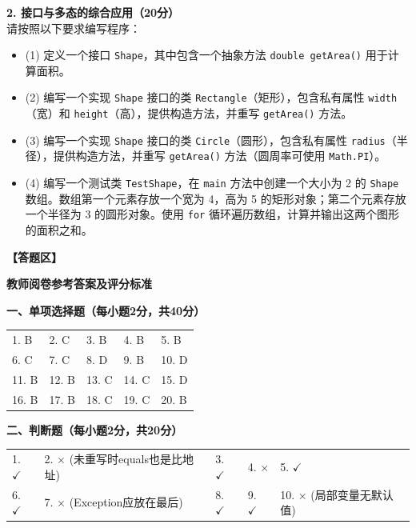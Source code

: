 \documentclass[a3paper, landscape, 11pt, twocolumn]{article}
\begin{document}
\textbf{2. 接口与多态的综合应用（20分）}\\
请按照以下要求编写程序：
\begin{itemize}
	\item (1) 定义一个接口 \texttt{Shape}，其中包含一个抽象方法 \texttt{double getArea()} 用于计算面积。
	\item (2) 编写一个实现 \texttt{Shape} 接口的类 \texttt{Rectangle}（矩形），包含私有属性 \texttt{width}（宽）和 \texttt{height}（高），提供构造方法，并重写 \texttt{getArea()} 方法。
	\item (3) 编写一个实现 \texttt{Shape} 接口的类 \texttt{Circle}（圆形），包含私有属性 \texttt{radius}（半径），提供构造方法，并重写 \texttt{getArea()} 方法（圆周率可使用 \texttt{Math.PI}）。
	\item (4) 编写一个测试类 \texttt{TestShape}，在 \texttt{main} 方法中创建一个大小为 2 的 \texttt{Shape} 数组。数组第一个元素存放一个宽为 4，高为 5 的矩形对象；第二个元素存放一个半径为 3 的圆形对象。使用 \texttt{for} 循环遍历数组，计算并输出这两个图形的面积之和。
\end{itemize}
\vspace{1em}
\textbf{【答题区】}

\newpage
\begin{center}
	{\huge\bfseries 教师阅卷参考答案及评分标准}
\end{center}
\vspace{1em}

\textbf{一、单项选择题（每小题2分，共40分）}
\begin{tabularx}{\textwidth}{XXXXX}
	1. B  & 2. C  & 3. B  & 4. B  & 5. B  \\
	6. C  & 7. C  & 8. D  & 9. B  & 10. D \\
	11. B & 12. B & 13. C & 14. C & 15. D \\
	16. B & 17. B & 18. C & 19. C & 20. B \\
\end{tabularx}

\vspace{1em}
\textbf{二、判断题（每小题2分，共20分）}
\begin{tabularx}{\textwidth}{XXXXX}
	1. $\checkmark$ & 2. $\times$ (未重写时equals也是比地址) & 3. $\checkmark$ & 4. $\times$     & 5. $\checkmark$         \\
	6. $\checkmark$ & 7. $\times$ (Exception应放在最后)  & 8. $\checkmark$ & 9. $\checkmark$ & 10. $\times$ (局部变量无默认值) \\
\end{tabularx}
\end{document}
